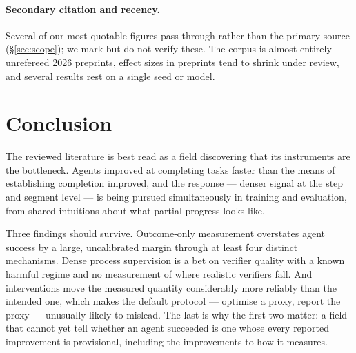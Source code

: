 \documentclass[10pt,twocolumn,a4paper]{article}
\begin{document}
\paragraph{Secondary citation and recency.}
Several of our most quotable figures pass through
\citet{chen2026horizongapplanningmemory} rather than the primary source
(\S\ref{sec:scope}); we mark but do not verify these.
The corpus is almost entirely unrefereed 2026 preprints, effect sizes in preprints tend to
shrink under review, and several results rest on a single seed or model.

\section{Conclusion}

The reviewed literature is best read as a field discovering that its instruments are the
bottleneck.
Agents improved at completing tasks faster than the means of establishing completion
improved, and the response --- denser signal at the step and segment level --- is being
pursued simultaneously in training and evaluation, from shared intuitions about what partial
progress looks like.

Three findings should survive.
Outcome-only measurement overstates agent success by a large, uncalibrated margin through at
least four distinct mechanisms.
Dense process supervision is a bet on verifier quality with a known harmful regime and no
measurement of where realistic verifiers fall.
And interventions move the measured quantity considerably more reliably than the intended
one, which makes the default protocol --- optimise a proxy, report the proxy --- unusually
likely to mislead.
The last is why the first two matter: a field that cannot yet tell whether an agent
succeeded is one whose every reported improvement is provisional, including the improvements
to how it measures.

{\footnotesize
\setlength{\bibsep}{2pt plus 1pt}


}
\end{document}
